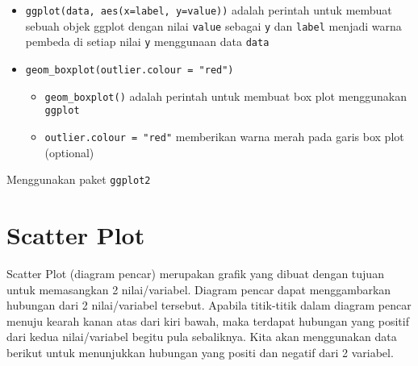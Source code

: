 \documentclass[
]{book}
\providecommand{\tightlist}{%
  \setlength{\itemsep}{0pt}\setlength{\parskip}{0pt}}
\begin{document}
\begin{itemize}
\tightlist
\item
  \texttt{ggplot(data,\ aes(x=label,\ y=value))} adalah perintah untuk membuat sebuah objek ggplot dengan nilai \texttt{value} sebagai \texttt{y} dan \texttt{label} menjadi warna pembeda di setiap nilai \texttt{y} menggunaan data \texttt{data}
\item
  \texttt{geom\_boxplot(outlier.colour\ =\ "red")}

  \begin{itemize}
  \tightlist
  \item
    \texttt{geom\_boxplot()} adalah perintah untuk membuat box plot menggunakan \texttt{ggplot}
  \item
    \texttt{outlier.colour\ =\ "red"} memberikan warna merah pada garis box plot (optional)
  \end{itemize}
\end{itemize}

Menggunakan paket \texttt{ggplot2}

\hypertarget{scatter-plot}{%
\section{Scatter Plot}\label{scatter-plot}}

Scatter Plot (diagram pencar) merupakan grafik yang dibuat dengan tujuan untuk memasangkan 2 nilai/variabel. Diagram pencar dapat menggambarkan hubungan dari 2 nilai/variabel tersebut. Apabila titik-titik dalam diagram pencar menuju kearah kanan atas dari kiri bawah, maka terdapat hubungan yang positif dari kedua nilai/variabel begitu pula sebaliknya. Kita akan menggunakan data berikut untuk menunjukkan hubungan yang positi dan negatif dari 2 variabel.
\end{document}
